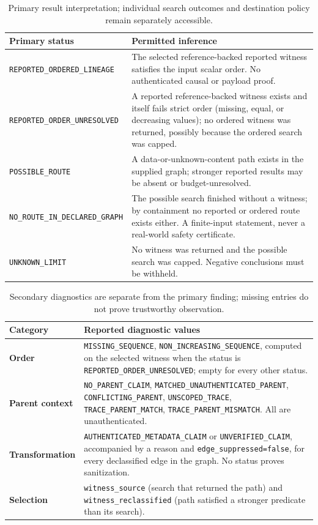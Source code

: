 \documentclass[11pt,letterpaper]{article}
\newcommand{\code}[1]{\texttt{#1}}
\newcommand{\st}[1]{\texttt{\scriptsize #1}}
\begin{document}
\begin{table}[htbp]
\centering\small
\caption{Primary result interpretation; individual search outcomes and destination policy remain separately accessible.}
\label{tab:states}
\begin{tabularx}{\textwidth}{@{}p{2.13in}L@{}}
\toprule
\textbf{Primary status} & \textbf{Permitted inference}\\
\midrule
\st{REPORTED\_ORDERED\_LINEAGE} & The selected reference-backed reported witness satisfies the input scalar order. No authenticated causal or payload proof.\\
\st{REPORTED\_ORDER\_UNRESOLVED} & A reported reference-backed witness exists and itself fails strict order (missing, equal, or decreasing values); no ordered witness was returned, possibly because the ordered search was capped.\\
\st{POSSIBLE\_ROUTE} & A data-or-unknown-content path exists in the supplied graph; stronger reported results may be absent or budget-unresolved.\\
\st{NO\_ROUTE\_IN\_DECLARED\_GRAPH} & The possible search finished without a witness; by containment no reported or ordered route exists either. A finite-input statement, never a real-world safety certificate.\\
\st{UNKNOWN\_LIMIT} & No witness was returned and the possible search was capped. Negative conclusions must be withheld.\\
\bottomrule
\end{tabularx}
\end{table}

\begin{table}[htbp]
\centering\small
\caption{Secondary diagnostics are separate from the primary finding; missing entries do not prove trustworthy observation.}
\label{tab:diagnostics}
\begin{tabularx}{\textwidth}{@{}p{1.28in}L@{}}
\toprule
\textbf{Category} & \textbf{Reported diagnostic values}\\
\midrule
\textbf{Order} & \code{MISSING\_SEQUENCE}, \code{NON\_INCREASING\_SEQUENCE}, computed on the selected witness when the status is \st{REPORTED\_ORDER\_UNRESOLVED}; empty for every other status.\\
\textbf{Parent context} & \code{NO\_PARENT\_CLAIM}, \code{MATCHED\_UNAUTHENTICATED\_PARENT}, \code{CONFLICTING\_PARENT}, \code{UNSCOPED\_TRACE}, \code{TRACE\_PARENT\_MATCH}, \code{TRACE\_PARENT\_MISMATCH}. All are unauthenticated.\\
\textbf{Transformation} & \code{AUTHENTICATED\_METADATA\_CLAIM} or \code{UNVERIFIED\_CLAIM}, accompanied by a reason and \code{edge\_suppressed=false}, for every declassified edge in the graph. No status proves sanitization.\\
\textbf{Selection} & \code{witness\_source} (search that returned the path) and \code{witness\_reclassified} (path satisfied a stronger predicate than its search).\\
\bottomrule
\end{tabularx}
\end{table}
\end{document}
